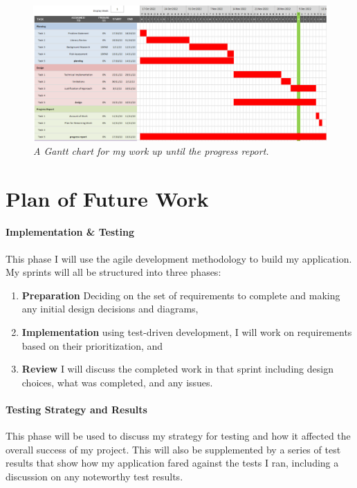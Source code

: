 \begin{figure}[ht]
  \includegraphics[width=\textwidth]{images/charts/gantt-chart-1.png}\vspace{-4mm}
  \caption{\textit{A Gantt chart for my work up until the progress report.}}
\end{figure}

\section{Plan of Future Work}

\paragraph{Implementation \& Testing}
This phase I will use the agile development methodology to build my application. My sprints will all be structured into three phases:

\begin{enumerate}
  \item \textbf{Preparation} Deciding on the set of requirements to complete and making any initial design decisions and diagrams,
  \item \textbf{Implementation} using test-driven development, I will work on requirements based on their prioritization, and
  \item \textbf{Review} I will discuss the completed work in that sprint including design choices, what was completed, and any issues.  
\end{enumerate}

\paragraph{Testing Strategy and Results}
This phase will be used to discuss my strategy for testing and how it affected the overall success of my project. This will also be supplemented by a series of test results that show how my application fared against the tests I ran, including a discussion on any noteworthy test results. 

